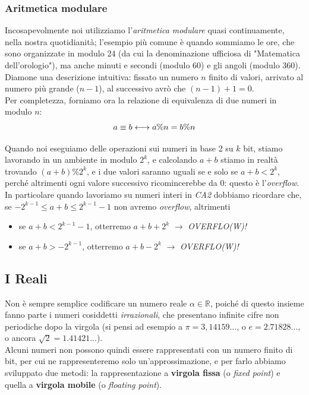 \subsubsection{Aritmetica modulare} Incosapevolmente noi utilizziamo l'\textit{aritmetica modulare} quasi continuamente, nella nostra quotidianità; l'esempio più comune è quando sommiamo le ore, che sono organizzate in modulo 24 (da cui la denominazione ufficiosa di "Matematica dell'orologio"), ma anche minuti e secondi (modulo 60) e gli angoli (modulo 360).\\
Diamone una descrizione intuitiva: fissato un numero $n$ finito di valori, arrivato al numero più grande ($n-1$), al successivo avrò che $(n-1)+1=0$.\\
Per completezza, forniamo ora la relazione di equivalenza di due numeri in modulo $n$:\\
\begin{equation*}
\centering
a\equiv b \longleftrightarrow a\%n=b\%n
\end{equation*}

Quando noi eseguiamo delle operazioni sui numeri in base 2 su $k$ bit, stiamo lavorando in un ambiente in modulo $2^{k}$, e calcolando $a+b$ stiamo in realtà trovando $(a+b)\%2^{k}$, e i due valori saranno uguali se e solo se $a+b<2^{k}$, perché altrimenti ogni valore successivo ricomincerebbe da 0: questo è l'\textit{overflow}.\\
In particolare quando lavoriamo su numeri interi in \textit{CA2} dobbiamo ricordare che, se $-2^{k-1}\le a+b\le 2^{k-1}-1$ non avremo \textit{overflow}, altrimenti
\begin{itemize}[noitemsep,nolistsep]
	\item se $a+b<2^{k-1}-1$, otterremo $a+b+2^{k}$ $\longrightarrow$ \textit{OVERFLO(W)!}
	\item se $a+b>-2^{k-1}$, otterremo $a+b-2^{k}$ $\longrightarrow$ \textit{OVERFLO(W)!}
\end{itemize}

\subsection{I Reali} Non è sempre semplice codificare un numero reale $\alpha \in \mathbb{R}$, poiché di questo insieme fanno parte i numeri cosiddetti \textit{irrazionali}, che presentano infinite cifre non periodiche dopo la virgola (si pensi ad esempio a $\pi=3,14159...$, o $e=2.71828...$, o ancora $\sqrt{2}=1.41421...$).\\
Alcuni numeri non possono quindi essere rappresentati con un numero finito di bit, per cui ne rappresenteremo solo un'approssimazione, e per farlo abbiamo sviluppato due metodi: la rappresentazione a \textbf{virgola fissa} (o \textit{fixed point}) e quella a \textbf{virgola mobile} (o \textit{floating point}).

